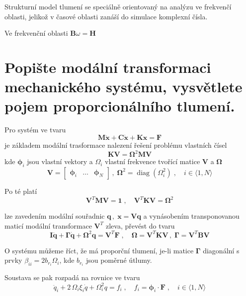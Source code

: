 \documentclass{article}
\begin{document}
	Strukturní model tlumení se speciálně orientovaný na analýzu ve frekvenčí oblasti, jelikož v časové oblasti zanáší do simulace komplexní čísla.

	Ve frekvenční oblasti $\bm{B}\omega = \bm{H}$

	\section{Popište modální transformaci mechanického systému, vysvětlete pojem proporcionálního tlumení. }

	Pro systém ve tvaru
	\begin{equation*}
		\bm{M}\bm{\ddot{x}} + \bm{C}\bm{\dot{x}} + \bm{K}\bm{x} = \bm{F}
	\end{equation*}
	je základem modální trasformace nalezení řešení problému vlastních čísel
	\begin{equation*}
		\bm{K}\bm{V} = \bm{\Omega}^2 \bm{M} \bm{V}
	\end{equation*}
	kde $\bm{\phi}_i$ jsou vlastní vektory a $\Omega_i$ vlastní frekvence tvořící matice $\bm{V}$ a $\bm{\Omega}$  
	\begin{equation*}
		\bm{V} = \begin{bmatrix} \bm{\phi}_i & \dots & \bm{\phi}_N \end{bmatrix}
		\,,\;
		\bm{\Omega}^2 = \operatorname{diag}(\Omega_i^2)
		\;,\quad 
		i \in \langle 1,N \rangle
	\end{equation*}

	Po té platí
	\begin{equation*}
		\bm{V}^T\bm{M}\bm{V} = \bm{1}
		\;,\quad 
		\bm{V}^T\bm{K}\bm{V} = \bm{\Omega}^2
	\end{equation*}
	
	lze zavedením modální souřadnic $\bm{q} \,,\; \bm{x} = \bm{V}\bm{q}$ a vynásobením transponovanou maticí modální transformace $\bm{V}^T$ zleva, převést do tvaru
	\begin{equation*}
		\bm{I}\bm{\ddot{q}} + \bm{\Gamma}\bm{\dot{q}} + \bm{\Omega}^2 \bm{q} = \bm{V}^T \bm{F}
		\;,\quad 
		\bm{\Omega} = \bm{V}^T\bm{K}\bm{V}
		\,,\;
		\bm{\Gamma} = \bm{V}^T\bm{B}\bm{V}
	\end{equation*}

	O systému můžeme říct, že má proporční tlumení, je-li matice $\bm{\Gamma}$ diagonální s prvky $\beta_{ii} = 2 b_{r_i} \Omega_i$, kde $b_{r_i}$ jsou poměrné útlumy.

	Soustava se pak rozpadá na rovnice ve tvaru
	\begin{equation*}
		\ddot{q}_i + 2\,\Omega_i\xi_i \dot{q} + \Omega_i^2 q = f_i
		\;,\quad 
		f_i = \bm{\phi}_i \cdot \bm{F}
		\;,\quad 
		i \in \langle 1,N \rangle
	\end{equation*}
\end{document}
